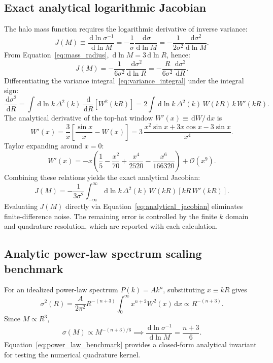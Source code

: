 \documentclass[11pt]{article}
\newcommand{\dd}{\,\mathrm d}
\begin{document}
\subsection{Exact analytical logarithmic Jacobian}
The halo mass function requires the logarithmic derivative of inverse variance:
\begin{equation}
J(M) \equiv \frac{\dd\ln\sigma^{-1}}{\dd\ln M} = -\frac{1}{\sigma}\frac{\dd\sigma}{\dd\ln M} = -\frac{1}{2\sigma^2}\frac{\dd\sigma^2}{\dd\ln M}.
\end{equation}
From Equation~\eqref{eq:mass_radius}, $\dd\ln M = 3\dd\ln R$, hence:
\begin{equation}
J(M) = -\frac{1}{6\sigma^2}\frac{\dd\sigma^2}{\dd\ln R} = -\frac{R}{6\sigma^2}\frac{\dd\sigma^2}{\dd R}.
\end{equation}
Differentiating the variance integral~\eqref{eq:variance_integral} under the integral sign:
\begin{equation}
\frac{\dd\sigma^2}{\dd R} = \int \dd\ln k\,\Delta^2(k)\,\frac{\dd}{\dd R}\left[ W^2(kR) \right] = 2\int \dd\ln k\,\Delta^2(k)\,W(kR)\,k\,W'(kR).
\end{equation}
The analytical derivative of the top-hat window $W'(x) \equiv \dd W/\dd x$ is
\begin{equation}
\boxed{W'(x) = \frac{3}{x}\left[ \frac{\sin x}{x} - W(x) \right] = 3\,\frac{x^2\sin x + 3x\cos x - 3\sin x}{x^4}}.
\end{equation}
Taylor expanding around $x = 0$:
\begin{equation}
W'(x) = -x\left( \frac{1}{5} - \frac{x^2}{70} + \frac{x^4}{2520} - \frac{x^6}{166320} \right) + \mathcal O(x^9).
\end{equation}
Combining these relations yields the exact analytical Jacobian:
\begin{equation}
\boxed{J(M) = -\frac{1}{3\sigma^2}\int_{-\infty}^\infty \dd\ln k\,\Delta^2(k)\,W(kR)\left[ kR\,W'(kR) \right]}.
\label{eq:analytical_jacobian}
\end{equation}
Evaluating $J(M)$ directly via Equation~\eqref{eq:analytical_jacobian} eliminates finite-difference noise. The remaining error is controlled by the finite $k$ domain and quadrature resolution, which are reported with each calculation.

\subsection{Analytic power-law spectrum scaling benchmark}
For an idealized power-law spectrum $P(k) = A k^n$, substituting $x \equiv kR$ gives
\begin{equation}
\sigma^2(R) = \frac{A}{2\pi^2}R^{-(n+3)}\int_0^\infty x^{n+2}W^2(x)\dd x \propto R^{-(n+3)}.
\end{equation}
Since $M \propto R^3$,
\begin{equation}
\sigma(M) \propto M^{-(n+3)/6} \implies \boxed{\frac{\dd\ln\sigma^{-1}}{\dd\ln M} = \frac{n+3}{6}}.
\label{eq:power_law_benchmark}
\end{equation}
Equation~\eqref{eq:power_law_benchmark} provides a closed-form analytical invariant for testing the numerical quadrature kernel.
\end{document}
